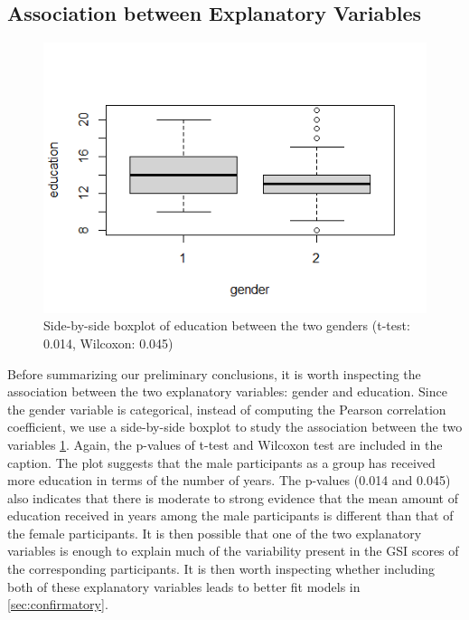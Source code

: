 \subsection{Association between Explanatory Variables}
\begin{figure}
\includegraphics[width=1\linewidth]{../../plots/box_correlation.png}
\caption{Side-by-side boxplot of education between the two genders (t-test: 0.014, Wilcoxon: 0.045)}
\label{tab:boxplot.correlation}
\end{figure}
Before summarizing our preliminary conclusions, it is worth inspecting the association between the two explanatory variables: gender and education. Since the gender variable is categorical, instead of computing the Pearson correlation coefficient, we use a side-by-side boxplot to study the association between the two variables \cref{tab:boxplot.correlation}. Again, the p-values of t-test and Wilcoxon test are included in the caption. The plot suggests that the male participants as a group has received more education in terms of the number of years. The p-values (0.014 and 0.045) also indicates that there is moderate to strong evidence that the mean amount of education received in years among the male participants is different than that of the female participants. It is then possible that one of the two explanatory variables is enough to explain much of the variability present in the GSI scores of the corresponding participants. It is then worth inspecting whether including both of these explanatory variables leads to better fit models in \cref{sec:confirmatory}.

